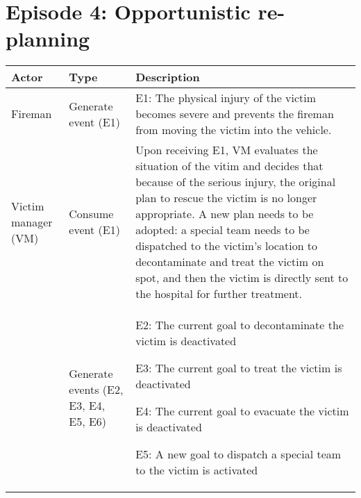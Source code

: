 \section{Episode 4: Opportunistic re-planning} %
\label{sec:episode_4_opportunistic_re_planning}
\footnotesize
{
	\begin{longtable}{>{\raggedright}p{1.2in}>{\raggedright}p{1.2in}>{\raggedright}p{3in}}
\toprule 
\textbf{Actor} & \textbf{Type} & \textbf{Description}\tabularnewline
\midrule 
Fireman & Generate event (E1) & E1: The physical injury of the victim becomes severe and prevents
the fireman from moving the victim into the vehicle.\tabularnewline
\midrule 
Victim manager (VM) & Consume event (E1) & Upon receiving E1, VM evaluates the situation of the vitim and decides
that because of the serious injury, the original plan to rescue the
victim is no longer appropriate. A new plan needs to be adopted: a
special team needs to be dispatched to the victim's location to decontaminate
and treat the victim on spot, and then the victim is directly sent
to the hospital for further treatment.\tabularnewline
\midrule 
 & Generate events (E2, E3, E4, E5, E6) & E2: The current goal to decontaminate the victim is deactivated

E3: The current goal to treat the victim is deactivated

E4: The current goal to evacuate the victim is deactivated

E5: A new goal to dispatch a special team to the victim is activated


\end{longtable}}
